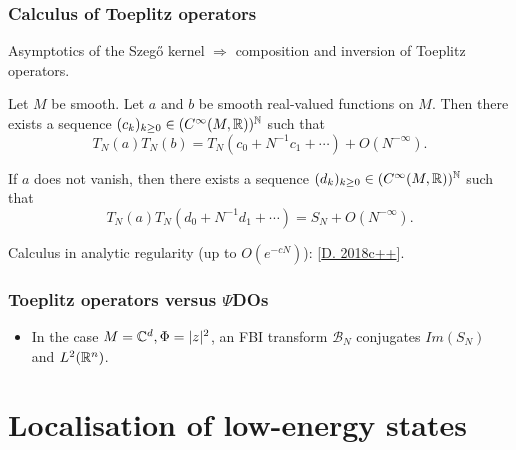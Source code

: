 \documentclass[mathserif]{beamer}
\newcommand{\mycite}[1]{{\color{mygreen} \small #1}}
\begin{document}
  \begin{frame}
    \frametitle{Calculus of Toeplitz operators}
    Asymptotics of the Szeg\H{o} kernel $\Rightarrow$ composition and
    inversion of Toeplitz operators.

    \begin{theorem}[{\mycite{[Schlichenmaier 2000]}}]Let $M$ be smooth. Let $a$ and $b$ be
      smooth real-valued functions on $M$. Then there exists a sequence $(c_k)_{k\geq
        0}\in (C^{\infty}(M,\mathbb{R}))^{\mathbb{N}}$ such that
      \[
        T_N(a)T_N(b)=T_N(c_0+N^{-1}c_1+\cdots)+O(N^{-\infty}).
        \]

        If $a$ does not vanish, then there exists a sequence
        $(d_k)_{k\geq 0}\in (C^{\infty}(M,\mathbb{R}))^{\mathbb{N}}$ such that
        \[
          T_N(a)T_N(d_0+N^{-1}d_1+\cdots)=S_N+O(N^{-\infty}).
          \]
        \end{theorem}
        Calculus in analytic regularity (up to $O(e^{-cN})$):
        \mycite{[\underline{D. 2018c++}]}.
  \end{frame}

\begin{frame}
  \frametitle{Toeplitz operators versus $\Psi$DOs}
  \begin{itemize}
  \item In the case $M=\mathbb{C}^d, \Phi=|z|^2$, an FBI transform $\mathcal{B}_N$ conjugates $Im(S_N)$ and
    $L^2(\mathbb{R}^n)$.

  \end{itemize}
\end{frame}




\section{Localisation of low-energy states}
\end{document}
